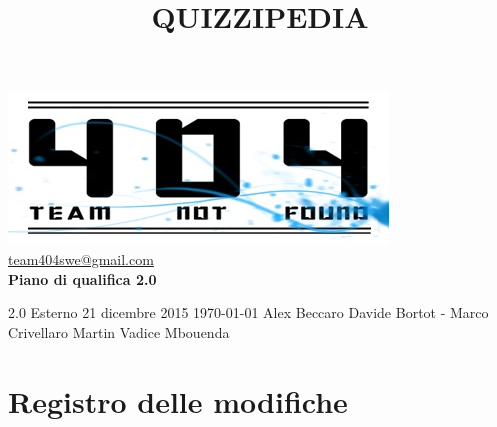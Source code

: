 \documentclass[a4paper,11pt]{article}
\title{\textbf{{\fontsize{8mm}{5mm}\selectfont QUIZZIPEDIA}}}
\date{}
\author{}
\begin{document}
	\maketitle
	\thispagestyle{empty}
	\begin{center}	
	\includegraphics{../../team_not_found}\\
	\fontsize{5mm}{3mm}\url{team404swe@gmail.com}\\
	
	\vspace{50mm}
	\textbf{Piano di qualifica 2.0}
	\end{center}
			{2.0} 							%
			{Esterno} 						%
			{21 dicembre 2015} 				%
			{\today} 						%
			{Alex Beccaro}	%
			{Davide Bortot - Marco Crivellaro } 	%
			{Martin Vadice Mbouenda} 			%
	\newpage
	\thispagestyle{empty}
	\null  %

	\newpage
	\newpage
	\fancyfoot[R]{\thepage}
	
	\hspace{30 mm}
	\section*{Registro delle modifiche}
	
\end{document}
